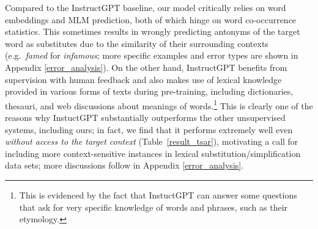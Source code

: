 \documentclass[11pt]{article}
\newcommand{\tabref}[2][]{Table#1~\ref{#2}\xspace}
\newcommand{\ex}[1]{\textit{#1}\xspace}
\begin{document}
Compared to the InstructGPT baseline, our model critically relies on word embeddings and MLM prediction, both of which hinge on word co-occurrence statistics. This sometimes results in wrongly predicting antonyms of the target word as substitutes due to the similarity of their surrounding contexts (e.g.\ \ex{famed} for \ex{infamous}; more specific examples and error types are shown in Appendix \ref{error_analysis}). On the other hand, InstructGPT benefits from supervision with human feedback and also makes use of lexical knowledge provided in various forms of texts during pre-training, including dictionaries, thesauri, and web discussions about meanings of words.\footnote{This is evidenced by the fact that InstuctGPT can answer some questions that ask for very specific knowledge of words and phrases, such as their etymology.} This is clearly one of the reasons why InstuctGPT substantially outperforms the other unsupervised systems, including ours; in fact, we find that it performs extremely well even {\it without access to the target context} (\tabref[]{result_tsar}), motivating a call for including more context-sensitive instances in lexical substitution/simplification data sets; more discussions follow in Appendix \ref{error_analysis}.








\newpage

\appendix
\end{document}
